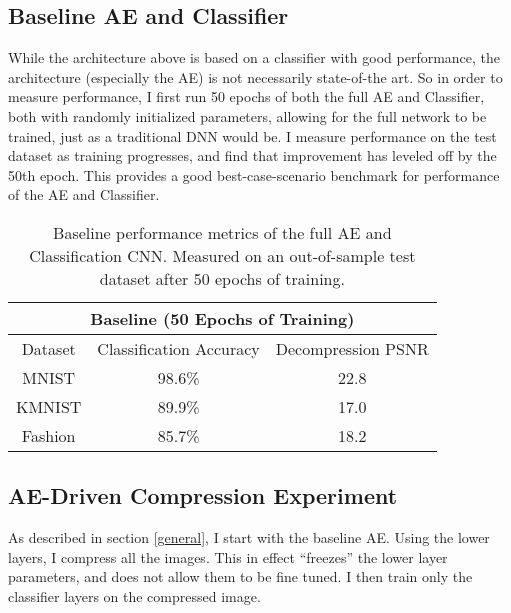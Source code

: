 \documentclass[twoside,11pt]{article}
\begin{document}
\subsection{Baseline AE and Classifier}

While the architecture above is based on a classifier with good performance,
the architecture (especially the AE) is not necessarily state-of-the art. 
So in order to measure performance, I first run 50 epochs of both the full AE and Classifier,
both with randomly initialized parameters, allowing for the full network to be trained,
just as a traditional DNN would be. I measure performance on the test dataset as training progresses,
and find that improvement has leveled off by the 50th epoch.
This provides a good best-case-scenario benchmark for performance of the AE and Classifier. 


\begin{table}[h]
  \centering
  \begin{tabular}{|c||c|c|}
    \hline
    \multicolumn{3}{|c|}{Baseline (50 Epochs of Training)}\\
    \hline
    Dataset & Classification Accuracy & Decompression PSNR \\
    \hline
    MNIST & 98.6\% & 22.8\\
    \hline
    KMNIST & 89.9\% & 17.0\\
    \hline
    Fashion & 85.7\% & 18.2\\
    \hline
  \end{tabular}
  \caption{Baseline performance metrics of the full AE and Classification CNN. 
   Measured on an out-of-sample test dataset after 50 epochs of training.}
  \label{table:base}
\end{table}

\subsection{AE-Driven Compression Experiment} \label{expAE}

As described in section \ref{general}, I start with the baseline AE.
Using the lower layers, I compress all the images. This in effect ``freezes'' the 
lower layer parameters, and does not allow them to be fine tuned. 
I then train only the classifier layers on the compressed image.
\end{document}
